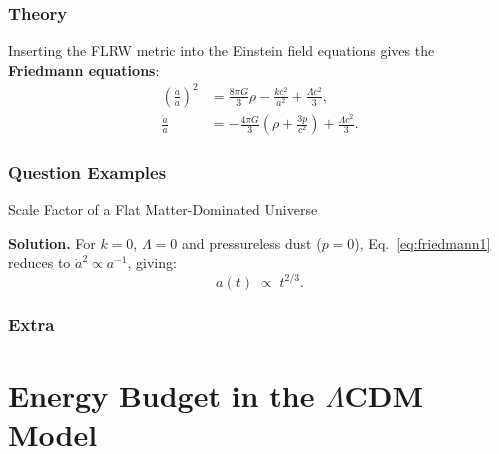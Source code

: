 \documentclass[12pt, a4paper, openright]{report}
\begin{document}
\subsection{Theory}

\begin{theory}
Inserting the FLRW metric into the Einstein field equations gives the 
\textbf{Friedmann equations}:
\begin{align}
  \left(\frac{\dot{a}}{a}\right)^{\!2}
    &= \frac{8\pi G}{3}\rho - \frac{kc^2}{a^2} + \frac{\Lambda c^2}{3},
    \label{eq:friedmann1}\\[6pt]
  \frac{\ddot{a}}{a}
    &= -\frac{4\pi G}{3}\!\left(\rho + \frac{3p}{c^2}\right) + \frac{\Lambda c^2}{3}.
    \label{eq:friedmann2}
\end{align}
\lipsum[14][1-4]   %
\end{theory}

\subsection{Question Examples}

\begin{example}{Scale Factor of a Flat Matter-Dominated Universe}{}
\lipsum[15][1-2]   %

\medskip\textbf{Solution.}\quad
For $k=0$, $\Lambda=0$ and pressureless dust ($p=0$), Eq.~\eqref{eq:friedmann1}
reduces to $\dot{a}^2 \propto a^{-1}$, giving:
\begin{equation}
  a(t) \;\propto\; t^{2/3}.
\end{equation}
\lipsum[15][3-4]   %
\end{example}

\subsection{Extra}

\begin{extra}
\lipsum[16][1-2]   %
\end{extra}

\clearpage

\chapter{Energy Budget in the $\Lambda$CDM Model}
\end{document}
